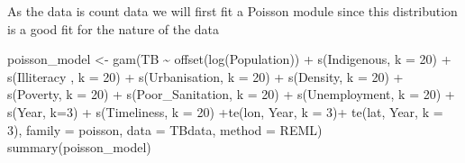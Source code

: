 \documentclass[
  letterpaper,
  DIV=11,
  numbers=noendperiod]{scrartcl}
\newenvironment{Shaded}{\begin{snugshade}}{\end{snugshade}}
\newcommand{\AttributeTok}[1]{\textcolor[rgb]{0.40,0.45,0.13}{#1}}
\newcommand{\DecValTok}[1]{\textcolor[rgb]{0.68,0.00,0.00}{#1}}
\newcommand{\FunctionTok}[1]{\textcolor[rgb]{0.28,0.35,0.67}{#1}}
\newcommand{\NormalTok}[1]{\textcolor[rgb]{0.00,0.23,0.31}{#1}}
\newcommand{\OtherTok}[1]{\textcolor[rgb]{0.00,0.23,0.31}{#1}}
\newcommand{\SpecialCharTok}[1]{\textcolor[rgb]{0.37,0.37,0.37}{#1}}
\newcommand{\StringTok}[1]{\textcolor[rgb]{0.13,0.47,0.30}{#1}}
\begin{document}
As the data is count data we will first fit a Poisson module since this
distribution is a good fit for the nature of the data

\begin{Shaded}
\begin{Highlighting}[]
\NormalTok{poisson\_model }\OtherTok{\textless{}{-}} \FunctionTok{gam}\NormalTok{(TB }\SpecialCharTok{\textasciitilde{}} \FunctionTok{offset}\NormalTok{(}\FunctionTok{log}\NormalTok{(Population)) }\SpecialCharTok{+} \FunctionTok{s}\NormalTok{(Indigenous, }\AttributeTok{k =} \DecValTok{20}\NormalTok{) }\SpecialCharTok{+} \FunctionTok{s}\NormalTok{(Illiteracy , }\AttributeTok{k =} \DecValTok{20}\NormalTok{) }\SpecialCharTok{+} \FunctionTok{s}\NormalTok{(Urbanisation, }\AttributeTok{k =} \DecValTok{20}\NormalTok{) }\SpecialCharTok{+} \FunctionTok{s}\NormalTok{(Density, }\AttributeTok{k =} \DecValTok{20}\NormalTok{) }\SpecialCharTok{+} \FunctionTok{s}\NormalTok{(Poverty, }\AttributeTok{k =} \DecValTok{20}\NormalTok{) }\SpecialCharTok{+} \FunctionTok{s}\NormalTok{(Poor\_Sanitation, }\AttributeTok{k =} \DecValTok{20}\NormalTok{) }\SpecialCharTok{+} \FunctionTok{s}\NormalTok{(Unemployment, }\AttributeTok{k =} \DecValTok{20}\NormalTok{) }\SpecialCharTok{+} \FunctionTok{s}\NormalTok{(Year, }\AttributeTok{k=}\DecValTok{3}\NormalTok{) }\SpecialCharTok{+} \FunctionTok{s}\NormalTok{(Timeliness, }\AttributeTok{k =} \DecValTok{20}\NormalTok{) }\SpecialCharTok{+}\FunctionTok{te}\NormalTok{(lon, Year, }\AttributeTok{k =} \DecValTok{3}\NormalTok{)}\SpecialCharTok{+} \FunctionTok{te}\NormalTok{(lat, Year, }\AttributeTok{k =} \DecValTok{3}\NormalTok{), }\AttributeTok{family =}\NormalTok{ poisson, }\AttributeTok{data =}\NormalTok{ TBdata, }\AttributeTok{method =} \StringTok{\textquotesingle{}REML\textquotesingle{}}\NormalTok{)}
\FunctionTok{summary}\NormalTok{(poisson\_model)}
\end{Highlighting}
\end{Shaded}
\end{document}
